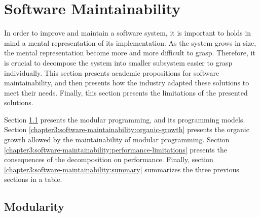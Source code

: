 \section{Software Maintainability} \label{chapter3:software-maintainability}


In order to improve and maintain a software system, it is important to holds in mind a mental representation of its implementation.
As the system grows in size, the mental representation become more and more difficult to grasp.
Therefore, it is crucial to decompose the system into smaller subsystem easier to grasp individually.
This section presents academic propositions for software maintainability, and then presents how the industry adapted these solutions to meet their needs.
Finally, this section presents the limitations of the presented solutions.


Section \ref{chapter3:software-maintainability:modularity} presents the modular programming, and its programming models.
Section \ref{chapter3:software-maintainability:organic-growth} presents the organic growth allowed by the maintainability of modular programming.
Section \ref{chapter3:software-maintainability:performance-limitations} presents the consequences of the decomposition on performance.
Finally, section \ref{chapter3:software-maintainability:summary} summarizes the three previous sections in a table.

\subsection{Modularity} \label{chapter3:software-maintainability:modularity}

